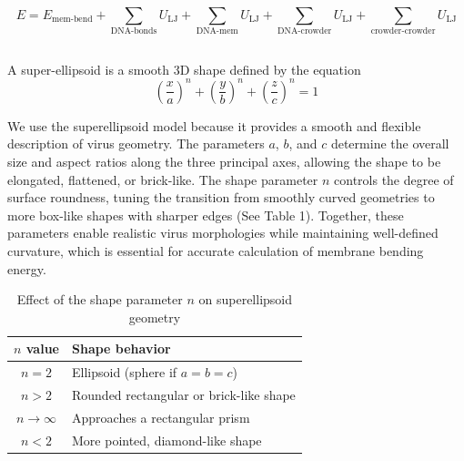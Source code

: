 \documentclass[12pt]{article}
\begin{document}
\begin{flushleft}
\begin{equation}
E = E_{\text{mem-bend}}+\sum_{\text{DNA-bonds}} U_{\mathrm{LJ}} + \sum_{\text{DNA-mem}} U_{\mathrm{LJ}} 
+ \sum_{\text{DNA-crowder}} U_{\mathrm{LJ}} 
+ \sum_{\text{crowder-crowder}} U_{\mathrm{LJ}}
\end{equation} 

\subsection*{}



A super-ellipsoid is a smooth 3D shape defined by the equation
\begin{equation}
\left( \frac{x}{a} \right)^n+\left( \frac{y}{b} \right)^n+\left( \frac{z}{c} \right)^n= 1
\end{equation}

\indent We use the superellipsoid model because it provides a smooth and flexible description of virus geometry. The parameters $a$, $b$, and $c$ determine the overall size and aspect ratios along the three principal axes, allowing the shape to be elongated, flattened, or brick-like. The shape parameter $n$ controls the degree of surface roundness, tuning the transition from smoothly curved geometries to more box-like shapes with sharper edges (See Table 1). Together, these parameters enable realistic virus morphologies while maintaining well-defined curvature, which is essential for accurate calculation of membrane bending energy.\\

\begin{table}[h!]
\centering
\caption{Effect of the shape parameter \(n\) on superellipsoid geometry}
\label{tab:superellipsoid_n}
\begin{tabular}{c l}
\hline
\(n\) value & Shape behavior \\
\hline
\(n = 2\) 
& Ellipsoid (sphere if \(a = b = c\)) \\

\(n > 2\) 
& Rounded rectangular or brick-like shape \\

\(n \rightarrow \infty\) 
& Approaches a rectangular prism \\

\(n < 2\) 
& More pointed, diamond-like shape \\
\hline
\end{tabular}
\end{table}


\end{flushleft}
\end{document}
